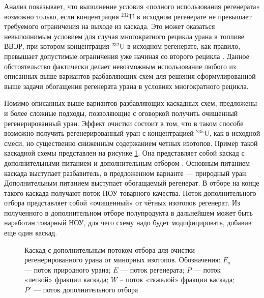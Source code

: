 Анализ показывает, что выполнение условия «полного использования регенерата» возможно только, если концентрация $^{232}$U в исходном регенерате не превышает требуемого ограничения на выходе из каскада. Это может оказаться невыполнимым условием для случая многократного рецикла урана в топливе ВВЭР, при котором концентрация $^{232}$U в исходном регенерате, как правило, превышает допустимые ограничения уже начиная со второго рецикла \cite{rodionovaAnalizTehnikoekonomicheskihHarakteristik2019,smirnovFizikotehnicheskieProblemyObogashcheniya2020}. Данное обстоятельство фактически делает невозможным использование любого из описанных выше вариантов разбавляющих схем для решения сформулированной выше задачи обогащения регенерата урана в условиях многократного рецикла.


Помимо описанных выше вариантов разбавляющих каскадных схем, предложены и более сложные подходы, позволяющие с оговоркой получить очищенный регенерированный уран. Эффект очистки состоит в том, что в таком способе возможно получить регенерированный уран с концентрацией $^{235}$U, как в исходной смеси, но существенно сниженным содержанием четных изотопов. Пример такой каскадной схемы представлен на рисунке \ref{fig:3_out}. Она представляет собой каскад с дополнительными питанием и дополнительным отбором \cite{palkinSeparationUraniumIsotopes2010}. Основным питанием каскада выступает разбавитель, в предложенном варианте --- природный уран. Дополнительным питанием выступает обогащаемый регенерат. В отборе на конце такого каскада получают поток НОУ товарного качества. Поток дополнительного отбора представляет собой «очищенный» от чётных изотопов регенерат. Из полученного в дополнительном отборе полупродукта в дальнейшем может быть наработан товарный НОУ, для чего схему надо будет модифицировать, добавив еще один каскад.

\begin{figure}[ht]
  \caption{Каскад с дополнительным потоком отбора для очистки регенерированного урана от минорных изотопов. Обозначения: $F_{n}$ --- поток природного урана; $E$ --- поток регенерата; $P$ --- поток «легкой» фракции каскада; $W$ – поток «тяжелой» фракции каскада; $P'$ --- поток дополнительного отбора}\label{fig:3_out}
\end{figure}

